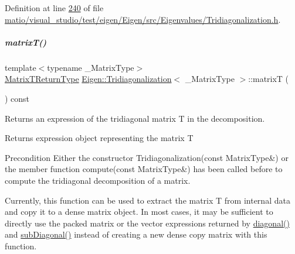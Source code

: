 Definition at line \hyperlink{matio_2visual__studio_2test_2eigen_2_eigen_2src_2_eigenvalues_2_tridiagonalization_8h_source_l00240}{240} of file \hyperlink{matio_2visual__studio_2test_2eigen_2_eigen_2src_2_eigenvalues_2_tridiagonalization_8h_source}{matio/visual\+\_\+studio/test/eigen/\+Eigen/src/\+Eigenvalues/\+Tridiagonalization.\+h}.

\mbox{\label{group___eigenvalues___module_a6eb5ef94b8b9bb013c0e69b6df56d0df}} 
\subparagraph{\texorpdfstring{matrix\+T()}{matrixT()}\hspace{0.1cm}{\footnotesize\ttfamily [1/2]}}
{\footnotesize\ttfamily template$<$typename \+\_\+\+Matrix\+Type$>$ \\
\hyperlink{struct_eigen_1_1internal_1_1_tridiagonalization_matrix_t_return_type}{Matrix\+T\+Return\+Type} \hyperlink{group___eigenvalues___module_class_eigen_1_1_tridiagonalization}{Eigen\+::\+Tridiagonalization}$<$ \+\_\+\+Matrix\+Type $>$\+::matrixT (\begin{DoxyParamCaption}{ }\end{DoxyParamCaption}) const\hspace{0.3cm}{\ttfamily [inline]}}



Returns an expression of the tridiagonal matrix T in the decomposition. 

\begin{DoxyReturn}{Returns}
expression object representing the matrix T
\end{DoxyReturn}
\begin{DoxyPrecond}{Precondition}
Either the constructor Tridiagonalization(const Matrix\+Type\&) or the member function compute(const Matrix\+Type\&) has been called before to compute the tridiagonal decomposition of a matrix.
\end{DoxyPrecond}
Currently, this function can be used to extract the matrix T from internal data and copy it to a dense matrix object. In most cases, it may be sufficient to directly use the packed matrix or the vector expressions returned by \hyperlink{group___eigenvalues___module_a0b7ff4860aa6f7c0761b1059c012fd8e}{diagonal()} and \hyperlink{group___eigenvalues___module_ac423dbb91157c159bdcb4b5a8371232e}{sub\+Diagonal()} instead of creating a new dense copy matrix with this function.

